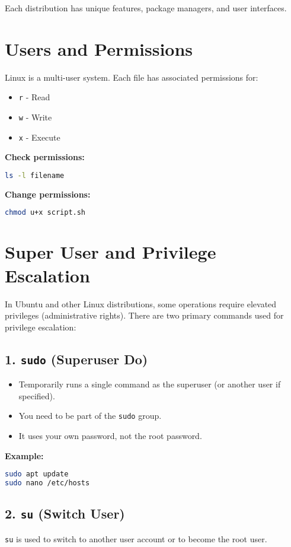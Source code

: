 \documentclass[12pt]{article}
\begin{document}
Each distribution has unique features, package managers, and user interfaces.

\section{Users and Permissions}
Linux is a multi-user system. Each file has associated permissions for:
\begin{itemize}
    \item \texttt{r} - Read
    \item \texttt{w} - Write
    \item \texttt{x} - Execute
\end{itemize}

\textbf{Check permissions:}
\begin{lstlisting}[language=bash]
ls -l filename
\end{lstlisting}

\textbf{Change permissions:}
\begin{lstlisting}[language=bash]
chmod u+x script.sh
\end{lstlisting}

\section{Super User and Privilege Escalation}

In Ubuntu and other Linux distributions, some operations require elevated privileges (administrative rights). There are two primary commands used for privilege escalation:

\subsection*{1. \texttt{sudo} (Superuser Do)}
\begin{itemize}
    \item Temporarily runs a single command as the superuser (or another user if specified).
    \item You need to be part of the \texttt{sudo} group.
    \item It uses your own password, not the root password.
\end{itemize}

\textbf{Example:}
\begin{lstlisting}[language=bash]
sudo apt update
sudo nano /etc/hosts
\end{lstlisting}

\subsection*{2. \texttt{su} (Switch User)}
\texttt{su} is used to switch to another user account or to become the root user.
\end{document}
